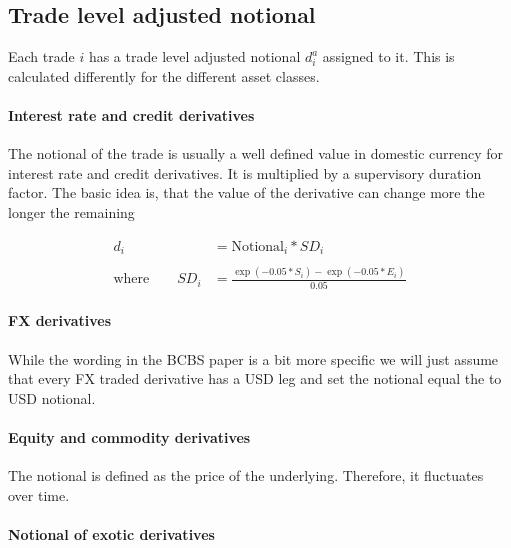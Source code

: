     \hypertarget{trade-level-adjusted-notional}{%
\subsection{Trade level adjusted
notional}\label{trade-level-adjusted-notional}}

Each trade \(i\) has a trade level adjusted notional \(d_i^a\) assigned
to it. This is calculated differently for the different asset classes.

\hypertarget{interest-rate-and-credit-derivatives}{%
\paragraph{Interest rate and credit
derivatives}\label{interest-rate-and-credit-derivatives}}

The notional of the trade is usually a well defined value in domestic
currency for interest rate and credit derivatives. It is multiplied by a
supervisory duration factor. The basic idea is, that the value of the
derivative can change more the longer the remaining

\begin{align*}
d_i &= \text{Notional}_i * SD_i \\
\\
\text{where} \qquad SD_i &=\frac{\exp\left(-0.05 * S_i\right)-\exp\left(-0.05 * E_i\right)}{0.05}
\end{align*}

\hypertarget{fx-derivatives}{%
\paragraph{FX derivatives}\label{fx-derivatives}}

While the wording in the BCBS paper is a bit more specific we will just
assume that every FX traded derivative has a USD leg and set the
notional equal the to USD notional.

\hypertarget{equity-and-commodity-derivatives}{%
\paragraph{Equity and commodity
derivatives}\label{equity-and-commodity-derivatives}}

The notional is defined as the price of the underlying. Therefore, it
fluctuates over time.

\hypertarget{notional-of-exotic-derivatives}{%
\paragraph{Notional of exotic
derivatives}\label{notional-of-exotic-derivatives}}

